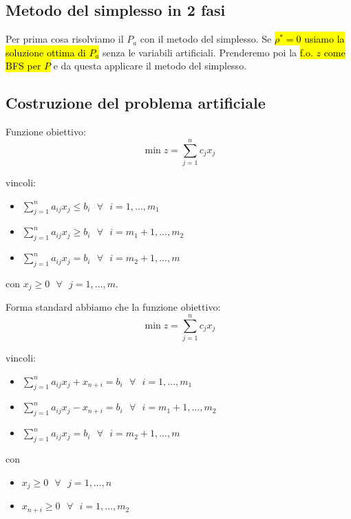 \subsection{Metodo del simplesso in 2 fasi}

Per prima cosa risolviamo il $P_a$ con il metodo del simplesso. Se \hl{$\rho^* = 0$ usiamo la soluzione ottima di $P_a$} senza le variabili artificiali. Prenderemo poi la \hl{f.o. $z$ come BFS per $P$} e da questa applicare il metodo del simplesso. 


\subsection{Costruzione del problema artificiale}

Funzione obiettivo:
$$\min z = \sum_{j = 1}^n c_jx_j$$

vincoli:

\begin{itemize}
	\item $\sum_{j=1}^n a_{ij}x_j \leq b_i\ \ \ \forall\ \ \ i = 1, ..., m_1$
	\item $\sum_{j=1}^n a_{ij}x_j \geq b_i\ \ \ \forall\ \ \ i = m_1+1, ..., m_2$
	\item $\sum_{j=1}^n a_{ij}x_j = b_i\ \ \ \forall\ \ \ i = m_2+1, ..., m$
\end{itemize}

con $x_j \geq 0\ \ \ \forall\ \ \ j = 1, ..., m$.

Forma standard abbiamo che la funzione obiettivo:
$$\min z = \sum_{j = 1}^n c_jx_j$$

vincoli:

\begin{itemize}
	\item $\sum_{j=1}^n a_{ij}x_j + x_{n+i} = b_i\ \ \ \forall\ \ \ i = 1, ..., m_1$
	\item $\sum_{j=1}^n a_{ij}x_j - x_{n+i} = b_i\ \ \ \forall\ \ \ i = m_1+1, ..., m_2$
	\item $\sum_{j=1}^n a_{ij}x_j = b_i\ \ \ \forall\ \ \ i = m_2+1, ..., m$
\end{itemize}

con 

\begin{itemize}
	\item $x_j \geq 0\ \ \ \forall\ \ \ j = 1, ..., n$
	\item $x_{n+i} \geq 0\ \ \ \forall\ \ \ i = 1, ..., m_2$
\end{itemize}

